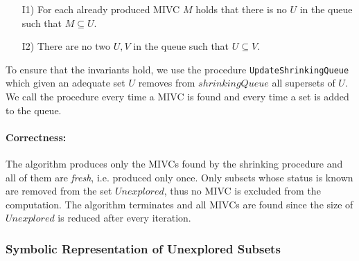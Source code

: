 \begin{itemize}
	\item[I1)] For each already produced MIVC $M$ holds that there is no $U$ in the queue such that $M \subseteq U$.
	\item[I2)] There are no two $U, V$ in the queue such that $U \subseteq V$.
\end{itemize}

To ensure that the invariants hold, we use the procedure \texttt{UpdateShrinking\-Queue} which given an adequate set $U$ removes from $\mathit{shrinkingQueue}$ all supersets of $U$. We call the procedure every time a MIVC is found and every time a set is added to the queue.

\paragraph{Correctness:}
The algorithm produces only the MIVCs found by the shrinking procedure and all of them are \emph{fresh}, i.e. produced only once. Only subsets whose status is known are removed from the set $\mathit{Unexplored}$, thus no MIVC is excluded from the computation. The algorithm terminates and all MIVCs are found since the size of $\mathit{Unexplored}$ is reduced after every iteration.
		

\subsubsection{Symbolic Representation of Unexplored Subsets}
\label{sec:symbolic-representation}






